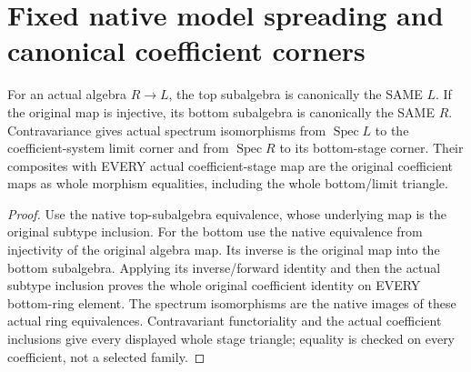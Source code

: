 \section{Fixed native model spreading and canonical coefficient corners}

\begin{definition}
\label{def:arithmetic-fixed-model-coefficient-corners}
\leanok
For an actual algebra $R\to L$, the top subalgebra is canonically the SAME
$L$. If the original map is injective, its bottom subalgebra is canonically
the SAME $R$. Contravariance gives actual spectrum isomorphisms from
$\operatorname{Spec}L$ to the coefficient-system limit corner and from
$\operatorname{Spec}R$ to its bottom-stage corner. Their composites with
EVERY actual coefficient-stage map are the original coefficient maps as
whole morphism equalities, including the whole bottom/limit triangle.
\end{definition}
\begin{proof}
Use the native top-subalgebra equivalence, whose underlying map is the
original subtype inclusion. For the bottom use the native equivalence
from injectivity of the original algebra map. Its inverse is the original
map into the bottom subalgebra. Applying its inverse/forward identity and
then the actual subtype inclusion proves the whole original coefficient
identity on EVERY bottom-ring element. The spectrum isomorphisms are the
native images of these actual ring equivalences. Contravariant functoriality
and the actual coefficient inclusions give every displayed whole stage
triangle; equality is checked on every coefficient, not a selected family.
\end{proof}

